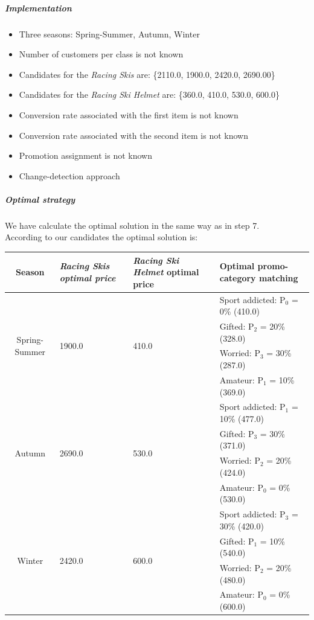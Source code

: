 \subparagraph{Implementation}
\begin{itemize}
	\item Three seasons: Spring-Summer, Autumn, Winter
	\item Number of customers per class is not known 
	\item Candidates for the \textit{Racing Skis} are: \{2110.0, 1900.0, 2420.0, 2690.00\}
	\item Candidates for the \textit{Racing Ski Helmet} are: \{360.0, 410.0, 530.0, 600.0\}
	\item Conversion rate associated with the first item is not known
	\item Conversion rate associated with the second item is not known
	\item Promotion assignment is not known 
	\item Change-detection approach
\end{itemize} 

\subparagraph{Optimal strategy}
We have calculate the optimal solution in the same way as in step 7.\\
According to our candidates the optimal solution is:

\begin{center}
	\begin{tabular}{|c|p{4cm}|p{4cm}|p{4cm}|} 
		\hline
		Season & \textit{Racing Skis optimal price} & \textit{Racing Ski Helmet} optimal price & Optimal promo-category matching \\ \hline
		\multirow{4}{*}{Spring-Summer} & \multirow{4}{*}{1900.0} & \multirow{4}{*}{410.0} & Sport addicted: P$_0$ = 0\% (410.0)  \\ 
								   & 					   &                      & Gifted: P$_2$ = 20\% (328.0)          \\ 
								   & 					   &                      & Worried: P$_3$ = 30\% (287.0)         \\
								   & 					   &                      & Amateur: P$_1$ = 10\% (369.0)         \\ \hline
		\multirow{4}{*}{Autumn} & \multirow{4}{*}{2690.0} & \multirow{4}{*}{530.0}  & Sport addicted: P$_1$ = 10\% (477.0)\\ 
		& 					   &                      & Gifted: P$_3$ = 30\% (371.0)         \\ 
		& 					   &                      & Worried: P$_2$ = 20\% (424.0)         \\
		& 					   &                      & Amateur: P$_0$ = 0\% (530.0)         \\ \hline
		\multirow{4}{*}{Winter} & \multirow{4}{*}{2420.0} & \multirow{4}{*}{600.0}  & Sport addicted: P$_3$ = 30\% (420.0)\\ 
		& 					   &                      & Gifted: P$_1$ = 10\% (540.0)         \\ 
		& 					   &                      & Worried: P$_2$ = 20\% (480.0)         \\
		& 					   &                      & Amateur: P$_0$ = 0\% (600.0)          \\ \hline
	\end{tabular}
\end{center}

